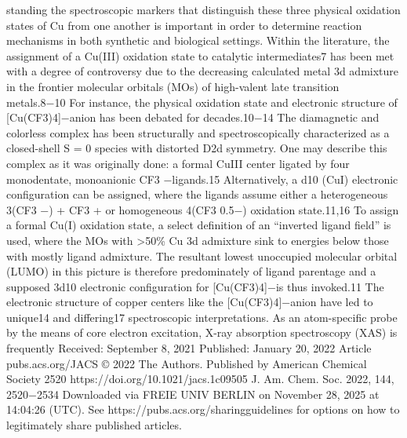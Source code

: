 \documentclass{article}
\begin{document}
standing the spectroscopic markers that distinguish these three
physical oxidation states of Cu from one another is important
in order to determine reaction mechanisms in both synthetic
and biological settings. Within the literature, the assignment of
a Cu(III) oxidation state to catalytic intermediates7 has been
met with a degree of controversy due to the decreasing
calculated metal 3d admixture in the frontier molecular orbitals
(MOs) of high-valent late transition metals.8−10 For instance,
the physical oxidation state and electronic structure of
[Cu(CF3)4]−anion has been debated for decades.10−14 The
diamagnetic and colorless complex has been structurally and
spectroscopically characterized as a closed-shell S = 0 species
with distorted D2d symmetry. One may describe this complex
as it was originally done: a formal CuIII center ligated by four
monodentate, monoanionic CF3
−ligands.15 Alternatively, a d10
(CuI) electronic conﬁguration can be assigned, where the
ligands assume either a heterogeneous 3(CF3
−) + CF3
+ or
homogeneous 4(CF3
0.5−) oxidation state.11,16 To assign a
formal Cu(I) oxidation state, a select deﬁnition of an “inverted
ligand ﬁeld” is used, where the MOs with >50\% Cu 3d
admixture sink to energies below those with mostly ligand
admixture. The resultant lowest unoccupied molecular orbital
(LUMO) in this picture is therefore predominately of ligand
parentage and a supposed 3d10 electronic conﬁguration for
[Cu(CF3)4]−is thus invoked.11 The electronic structure of
copper centers like the [Cu(CF3)4]−anion have led to
unique14 and diﬀering17 spectroscopic interpretations.
As an atom-speciﬁc probe by the means of core electron
excitation, X-ray absorption spectroscopy (XAS) is frequently
Received:
September 8, 2021
Published: January 20, 2022
Article
pubs.acs.org/JACS
© 2022 The Authors. Published by
American Chemical Society
2520
https://doi.org/10.1021/jacs.1c09505
J. Am. Chem. Soc. 2022, 144, 2520−2534
Downloaded via FREIE UNIV BERLIN on November 28, 2025 at 14:04:26 (UTC).
See https://pubs.acs.org/sharingguidelines for options on how to legitimately share published articles.

\newpage

\end{document}
